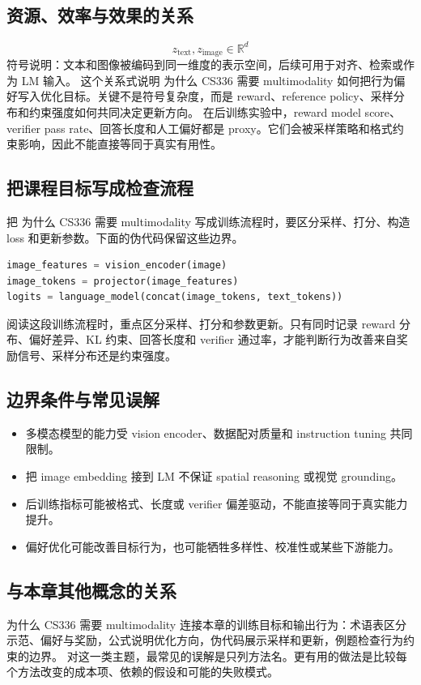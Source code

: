 \documentclass[a4paper]{article}
\begin{document}
\subsection{资源、效率与效果的关系}
\[z_{\text{text}},z_{\text{image}}\in\mathbb{R}^{d}\]
符号说明：文本和图像被编码到同一维度的表示空间，后续可用于对齐、检索或作为 LM 输入。
这个关系式说明 为什么 CS336 需要 multimodality 如何把行为偏好写入优化目标。关键不是符号复杂度，而是 reward、reference policy、采样分布和约束强度如何共同决定更新方向。
在后训练实验中，reward model score、verifier pass rate、回答长度和人工偏好都是 proxy。它们会被采样策略和格式约束影响，因此不能直接等同于真实有用性。
\subsection{把课程目标写成检查流程}
把 为什么 CS336 需要 multimodality 写成训练流程时，要区分采样、打分、构造 loss 和更新参数。下面的伪代码保留这些边界。
\begin{lstlisting}[language=Python]
image_features = vision_encoder(image)
image_tokens = projector(image_features)
logits = language_model(concat(image_tokens, text_tokens))
\end{lstlisting}
阅读这段训练流程时，重点区分采样、打分和参数更新。只有同时记录 reward 分布、偏好差异、KL 约束、回答长度和 verifier 通过率，才能判断行为改善来自奖励信号、采样分布还是约束强度。
\subsection{边界条件与常见误解}
\begin{itemize}
\item 多模态模型的能力受 vision encoder、数据配对质量和 instruction tuning 共同限制。
\item 把 image embedding 接到 LM 不保证 spatial reasoning 或视觉 grounding。
\item 后训练指标可能被格式、长度或 verifier 偏差驱动，不能直接等同于真实能力提升。
\item 偏好优化可能改善目标行为，也可能牺牲多样性、校准性或某些下游能力。
\end{itemize}
\subsection{与本章其他概念的关系}
为什么 CS336 需要 multimodality 连接本章的训练目标和输出行为：术语表区分示范、偏好与奖励，公式说明优化方向，伪代码展示采样和更新，例题检查行为约束的边界。
对这一类主题，最常见的误解是只列方法名。更有用的做法是比较每个方法改变的成本项、依赖的假设和可能的失败模式。
\end{document}
